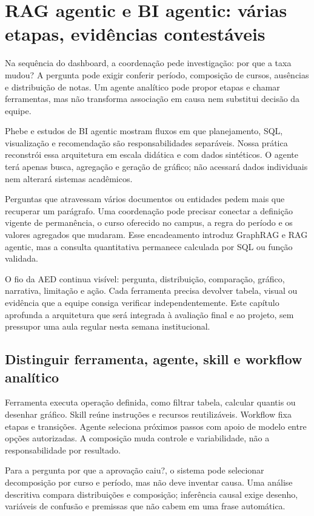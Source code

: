 \chapter{RAG agentic e BI agentic: várias etapas, evidências contestáveis}

Na sequência do dashboard, a coordenação pede investigação: por que a taxa mudou? A pergunta pode exigir conferir período, composição de cursos, ausências e distribuição de notas. Um agente analítico pode propor etapas e chamar ferramentas, mas não transforma associação em causa nem substitui decisão da equipe.

Phebe e estudos de BI agentic mostram fluxos em que planejamento, SQL, visualização e recomendação são responsabilidades separáveis. Nossa prática reconstrói essa arquitetura em escala didática e com dados sintéticos. O agente terá apenas busca, agregação e geração de gráfico; não acessará dados individuais nem alterará sistemas acadêmicos.

Perguntas que atravessam vários documentos ou entidades pedem mais que recuperar um parágrafo. Uma coordenação pode precisar conectar a definição vigente de permanência, o curso oferecido no campus, a regra do período e os valores agregados que mudaram. Esse encadeamento introduz GraphRAG e RAG agentic, mas a consulta quantitativa permanece calculada por SQL ou função validada.

O fio da AED continua visível: pergunta, distribuição, comparação, gráfico, narrativa, limitação e ação. Cada ferramenta precisa devolver tabela, visual ou evidência que a equipe consiga verificar independentemente. Este capítulo aprofunda a arquitetura que será integrada à avaliação final e ao projeto, sem pressupor uma aula regular nesta semana institucional.

\section{Distinguir ferramenta, agente, skill e workflow analítico}

Ferramenta executa operação definida, como filtrar tabela, calcular quantis ou desenhar gráfico. Skill reúne instruções e recursos reutilizáveis. Workflow fixa etapas e transições. Agente seleciona próximos passos com apoio de modelo entre opções autorizadas. A composição muda controle e variabilidade, não a responsabilidade por resultado.

Para a pergunta por que a aprovação caiu?, o sistema pode selecionar decomposição por curso e período, mas não deve inventar causa. Uma análise descritiva compara distribuições e composição; inferência causal exige desenho, variáveis de confusão e premissas que não cabem em uma frase automática.

